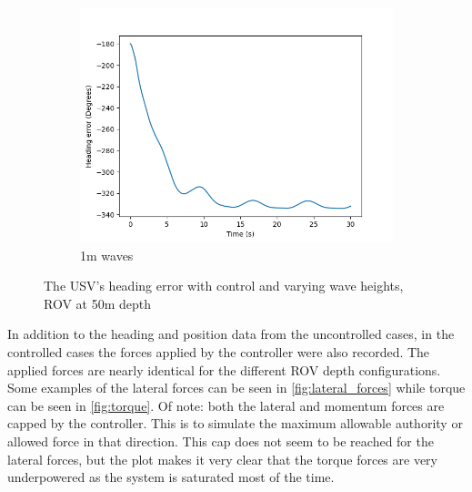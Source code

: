 \documentclass[class=article, crop=false]{standalone}
\begin{document}
\begin{figure}
\begin{subfigure}{0.65\textwidth}
        \includegraphics{scenario1/rov-50m/1.0m/usv_heading_error_controlled}
        \caption{1m waves}
        \label{fig:position_controlled_1m}
    \end{subfigure}
    \vfill
    \caption{The USV's heading error with control and varying wave heights, ROV at 50m depth}
    \label{fig:heading_error_controlled}
\end{figure}

In addition to the heading and position data from the uncontrolled cases, in the controlled cases the forces applied by the controller were also recorded. The applied forces are nearly identical for the different ROV depth configurations. Some examples of the lateral forces can be seen in \cref{fig:lateral_forces} while torque can be seen in \cref{fig:torque}. Of note: both the lateral and momentum forces are capped by the controller. This is to simulate the maximum allowable authority or allowed force in that direction. This cap does not seem to be reached for the lateral forces, but the plot makes it very clear that the torque forces are very underpowered as the system is saturated most of the time.
\end{document}
